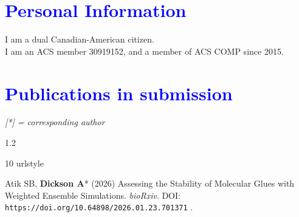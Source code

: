 \documentclass[margin,line]{res}
\begin{document}
\begin{resume}
\section{\sc \textcolor{blue}{ Personal Information}}
I am a dual Canadian-American citizen.\\
I am an ACS member 30919152, and a member of ACS COMP since 2015.

\newpage
\section{\sc \textcolor{blue}{Publications in submission}}


\emph{[*] = corresponding author}
\vspace {0.05in}

\begingroup
\begin{spacing}{1.2}
\renewcommand{\section}[2]{}%
\begin{thebibliography}{10}
\providecommand{\url}[1]{\texttt{#1}}
\providecommand{\urlprefix}{URL }
\expandafter\ifx\csname urlstyle\endcsname\relax
  \providecommand{\doi}[1]{doi:\discretionary{}{}{}#1}\else
  \providecommand{\doi}{doi:\discretionary{}{}{}\begingroup
  \urlstyle{rm}\Url}\fi
\providecommand{\bibAnnoteFile}[1]{%
  \IfFileExists{#1}{\begin{quotation}\noindent\textsc{Key:} #1\\
  \textsc{Annotation:}\ \end{quotation}}{}}
\providecommand{\bibAnnote}[2]{%
  \begin{quotation}\noindent\textsc{Key:} #1\\
  \textsc{Annotation:}\ #2\end{quotation}}
\providecommand{\eprint}[2][]{\url{#2}}

\setlength{\itemsep}{0.15in}


  Atik SB, {\bf Dickson A}* (2026) Assessing the Stability of Molecular Glues with Weighted Ensemble Simulations.
  \newblock \textit{bioRxiv}. DOI: \url{https://doi.org/10.64898/2026.01.23.701371} .


\end{thebibliography}
\end{spacing}
\end{resume}
\end{document}
